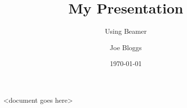 \documentclass{beamer}
\title{My Presentation}
\subtitle{Using Beamer}
\author{Joe Bloggs}
\institute{University of ShareLaTeX}
\date{\today}
\begin{document}
 <document goes here>
\end{document}
